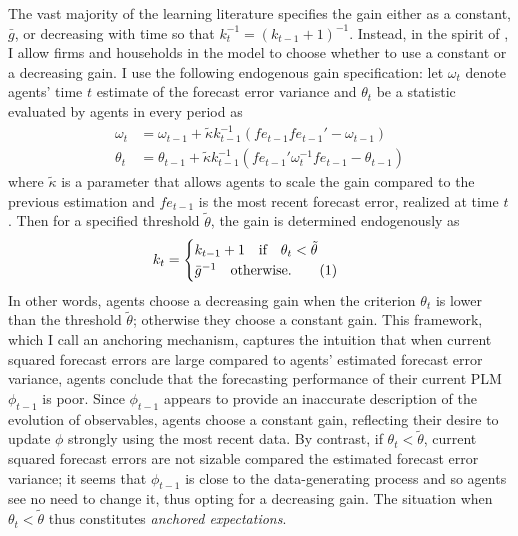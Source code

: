 \documentclass[11pt]{article}
\renewcommand{\[}{\begin{equation}}
\renewcommand{\]}{\end{equation}}
\newcommand\numberthis{\addtocounter{equation}{1}\tag{\theequation}} %
\begin{document}
The vast majority of the learning literature specifies the gain either as a constant, $\bar{g}$, or decreasing with time so that $k_t^{-1} = (k_{t-1}+1)^{-1}$. Instead, in the spirit of \cite{carvalho2019anchored}, I allow firms and households in the model to choose whether to use a constant or a decreasing gain. I use the following endogenous gain specification: let $\omega_t$ denote agents' time $t$ estimate of the forecast error variance and $\theta_t$ be a statistic evaluated by agents in every period as
\begin{align}
\omega_t & =  \omega_{t-1} + \tilde{\kappa} k_{t-1}^{-1}(fe_{t-1} fe_{t-1}'  -\omega_{t-1})\\
\theta_t & =  \theta_{t-1} + \tilde{\kappa} k_{t-1}^{-1}(fe_{t-1}'\omega_t^{-1}fe_{t-1} -\theta_{t-1}) \label{cusum_crit}
\end{align}
where $\tilde{\kappa}$ is a parameter that allows agents to scale the gain compared to the previous estimation and $fe_{t-1}$ is the most recent forecast error, realized at time $t$. Then for a specified threshold $\tilde{\theta}$, the gain is determined endogenously as
\begin{align*}
k_t & = \begin{cases} k_{t-1}+1 \quad \text{if} \quad \theta_t < \tilde{\theta}  \\ \bar{g}^{-1}  \quad \text{otherwise.}\numberthis \label{anchoring}
\end{cases} 
\end{align*}
In other words, agents choose a decreasing gain when the criterion $\theta_t$ is lower than the threshold $\tilde{\theta}$; otherwise they choose a constant gain. This framework, which I call an anchoring mechanism, captures the intuition that when current squared forecast errors are large compared to agents' estimated forecast error variance, agents conclude that the forecasting performance of their current PLM $\phi_{t-1}$ is poor. Since $\phi_{t-1}$ appears to provide an inaccurate description of the evolution of observables, agents choose a constant gain, reflecting their desire to update $\phi$ strongly using the most recent data. By contrast, if $\theta_t <\tilde{\theta}$, current squared forecast errors are not sizable compared the estimated forecast error variance; it seems that $\phi_{t-1}$ is close to the data-generating process and so agents see no need to change it, thus opting for a decreasing gain. The situation when $\theta_t <\tilde{\theta}$  thus constitutes \emph{anchored expectations}.
\end{document}
